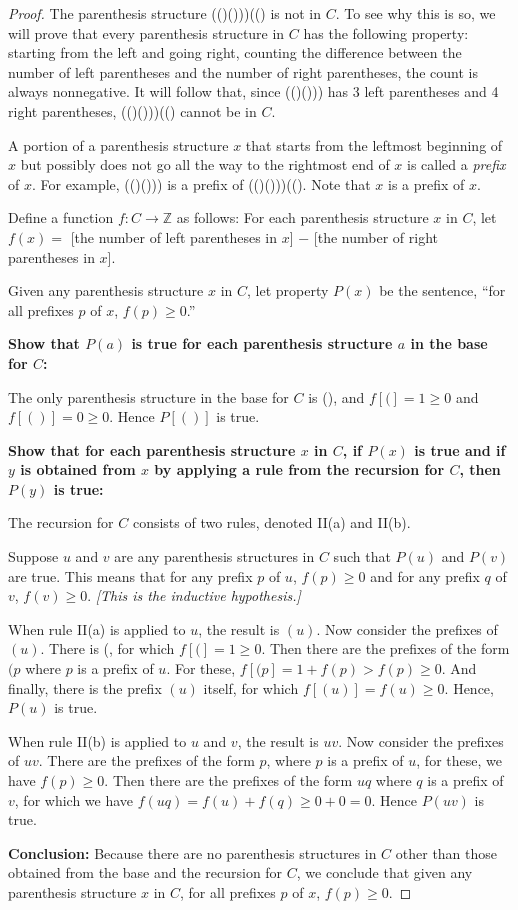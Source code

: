 \documentclass[14pt]{extarticle}
\newcommand{\Z}{\mathbb{Z}}
\begin{document}
\begin{proof}
The parenthesis structure (()()))(() is not in $C$. To see why this is so, we will prove that every parenthesis 
structure in $C$ has the following property: starting from the left and going right, counting the difference between 
the number of left parentheses and the number of right parentheses, the count is always nonnegative. It will 
follow that, since (()())) has 3 left parentheses and 4 right parentheses, (()()))(() cannot be in $C$.

A portion of a parenthesis structure $x$ that starts from the leftmost beginning of $x$ but possibly does not go all 
the way to the rightmost end of $x$ is called a {\it prefix} of $x$. For example, (()())) is a prefix of (()()))((). Note that $x$ is a prefix of $x$.

Define a function \(f: C \to \Z\) as follows: For each parenthesis structure $x$ in $C$, let \(f(x) = \)
[the number of left parentheses in $x$] $-$ [the number of right parentheses in $x$].

Given any parenthesis structure $x$ in $C$, let property $P(x)$ be the sentence, “for all prefixes $p$ of $x$, $f(p) \geq 0$.”

{\bf Show that $P(a)$ is true for each parenthesis structure $a$ in the base for $C$:}

The only parenthesis structure in the base for $C$ is (), and $f[(] = 1 \geq 0$ and $f[()] = 0 \geq 0$. Hence $P[()]$ is true. 

{\bf Show that for each parenthesis structure $x$ in $C$, if $P(x)$ is true and if $y$ is obtained from $x$ by 
applying a rule from the recursion for $C$, then $P(y)$ is true:}

The recursion for $C$ consists of two rules, denoted II(a) and II(b).

Suppose $u$ and $v$ are any parenthesis structures in $C$ such that $P(u)$ and $P(v)$ are true. This means that for 
any prefix $p$ of $u$, $f(p) \geq 0$ and for any prefix $q$ of $v$, $f(v) \geq 0$. {\it [This is the inductive hypothesis.]}

When rule II(a) is applied to $u$, the result is $(u)$. Now consider the prefixes of $(u)$. There is (, for which 
\(f[(] = 1 \geq 0\). Then there are the prefixes of the form $(p$ where $p$ is a prefix of $u$. For these, 
\(f[(p] = 1 + f(p) > f(p) \geq 0\). And finally, there is the prefix $(u)$ itself, for which 
\(f[(u)] = f(u) \geq 0\). Hence, $P(u)$ is true. 

When rule II(b) is applied to $u$ and $v$, the result is $uv$. Now consider the prefixes of $uv$. There are the 
prefixes of the form $p$, where $p$ is a prefix of $u$, for these, we have \(f(p) \geq 0\). Then there are the prefixes 
of the form $uq$ where $q$ is a prefix of $v$, for which we have \(f(uq) = f(u) + f(q) \geq 0 + 0 = 0\). 
Hence $P(uv)$ is true. 

{\bf Conclusion:} Because there are no parenthesis structures in $C$ other than those obtained from the base 
and the recursion for $C$, we conclude that given any parenthesis structure $x$ in $C$, for all prefixes $p$ of $x$, \(f(p) \geq 0\).
\end{proof}
\end{document}
